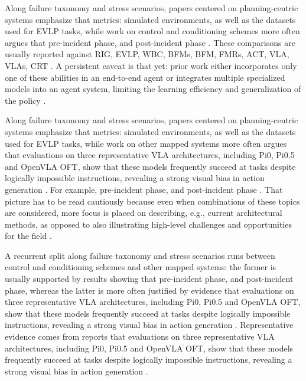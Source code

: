 \documentclass[a4paper,11pt]{article}
\begin{document}
Along failure taxonomy and stress scenarios, papers centered on planning-centric systems emphasize that metrics: simulated environments, as well as the datasets used for EVLP tasks, while work on control and conditioning schemes more often argues that pre-incident phase, and post-incident phase \citep{Zhao2025Synergizing,Francis2021Core,Kojima2025Comprehensive,Yuan2025Survey}. These comparisons are usually reported against RIG, EVLP, WBC, BFMs, BFM, FMRs, ACT, VLA, VLAs, CRT \citep{Zhao2025Synergizing,Francis2023Core,Francis2021Core,Yuan2025Survey}. A persistent caveat is that yet: prior work either incorporates only one of these abilities in an end-to-end agent or integrates multiple specialized models into an agent system, limiting the learning efficiency and generalization of the policy \citep{Zhao2025Synergizing}.

Along failure taxonomy and stress scenarios, papers centered on planning-centric systems emphasize that metrics: simulated environments, as well as the datasets used for EVLP tasks, while work on other mapped systems more often argues that evaluations on three representative VLA architectures, including Pi0, Pi0.5 and OpenVLA OFT, show that these models frequently succeed at tasks despite logically impossible instructions, revealing a strong visual bias in action generation \citep{Zhao2025Synergizing,Francis2021Core,Zhang2026Restoring,Liang2025Bootstrap}. For example, pre-incident phase, and post-incident phase \citep{Kojima2025Comprehensive}. That picture has to be read cautiously because even when combinations of these topics are considered, more focus is placed on describing, e.g., current architectural methods, as opposed to also illustrating high-level challenges and opportunities for the field \citep{Francis2023Core}.

A recurrent split along failure taxonomy and stress scenarios runs between control and conditioning schemes and other mapped systems: the former is usually supported by results showing that pre-incident phase, and post-incident phase, whereas the latter is more often justified by evidence that evaluations on three representative VLA architectures, including Pi0, Pi0.5 and OpenVLA OFT, show that these models frequently succeed at tasks despite logically impossible instructions, revealing a strong visual bias in action generation \citep{Kojima2025Comprehensive,Yuan2025Survey,Zhang2026Restoring,Liang2025Bootstrap}. Representative evidence comes from reports that evaluations on three representative VLA architectures, including Pi0, Pi0.5 and OpenVLA OFT, show that these models frequently succeed at tasks despite logically impossible instructions, revealing a strong visual bias in action generation \citep{Zhang2026Restoring}.
\end{document}

